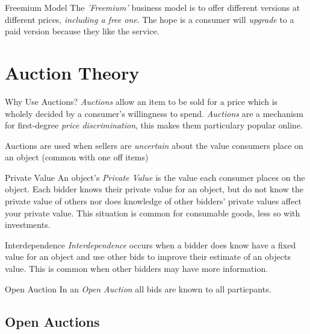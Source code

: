 \documentclass[11pt,a4paper]{article}
\begin{document}
\begin{proposition}{Freemium Model}
  The \textit{'Freemium'} business model is to offer different versions at different prices, \textit{including a free one}. The hope is a consumer will \textit{upgrade} to a paid version because they like the service.
\end{proposition}

\section{Auction Theory}

\begin{remark}{Why Use Auctions?}
  \textit{Auctions} allow an item to be sold for a price which is wholely decided by a consumer's willingness to spend. \textit{Auctions} are a mechanism for first-degree \textit{price discrimination}, this makes them particulary popular online.
  \par Auctions are used when sellers are \textit{uncertain} about the value consumers place on an object (common with one off items)
\end{remark}

\begin{definition}{Private Value}
  An object's \textit{Private Value} is the value each consumer places on the object. Each bidder knows their private value for an object, but do not know the private value of others nor does knowledge of other bidders' private values affect your private value. This situation is common for consumable goods, less so with investments.
\end{definition}

\begin{definition}{Interdependence}
  \textit{Interdependence} occurs when a bidder does know have a fixed value for an object and use other bids to improve their estimate of an objects value. This is common when other bidders may have more information.
\end{definition}

\begin{definition}{Open Auction}
  In an \textit{Open Auction} all bids are known to all particpants.
\end{definition}

\subsection{Open Auctions}
\end{document}
